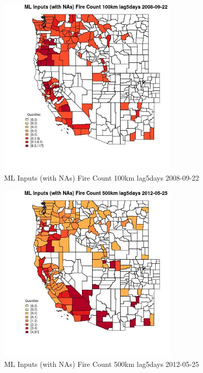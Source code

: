 \begin{figure} 
\centering  
\includegraphics[width=0.77\textwidth]{Code_Outputs/Report_ML_input_PM25_Step4_part_e_de_duplicated_aves_compiled_2019-05-18wNAs_CountyFire_Count_100km_lag5daysMean2008-09-22_2008-09-22.jpg} 
\caption{\label{fig:Report_ML_input_PM25_Step4_part_e_de_duplicated_aves_compiled_2019-05-18wNAsCountyFire_Count_100km_lag5daysMean2008-09-22_2008-09-22}ML Inputs (with NAs) Fire Count 100km lag5days 2008-09-22} 
\end{figure} 
 

\begin{figure} 
\centering  
\includegraphics[width=0.77\textwidth]{Code_Outputs/Report_ML_input_PM25_Step4_part_e_de_duplicated_aves_compiled_2019-05-18wNAs_CountyFire_Count_500km_lag5daysMean2012-05-25_2012-05-25.jpg} 
\caption{\label{fig:Report_ML_input_PM25_Step4_part_e_de_duplicated_aves_compiled_2019-05-18wNAsCountyFire_Count_500km_lag5daysMean2012-05-25_2012-05-25}ML Inputs (with NAs) Fire Count 500km lag5days 2012-05-25} 
\end{figure} 
 

